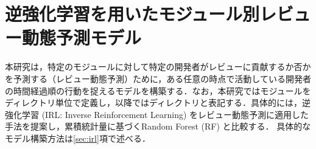\documentclass[submit,noauthor,ses,dvipdfmx]{ipsj}
\newcommand{\todo}[1]{\colorbox{yellow}{{\bf TODO}:}{\color{red} {\textbf{[#1]}}}}
\begin{document}



\vspace{-2mm}
\section{逆強化学習を用いたモジュール別レビュー動態予測モデル}\label{sec:model}

本研究は，特定のモジュールに対して特定の開発者がレビューに貢献するか否かを予測する（レビュー動態予測）ために，ある任意の時点で活動している開発者の時間経過順の行動を捉えるモデルを構築する．なお，本研究ではモジュールをディレクトリ単位で定義し，以降ではディレクトリと表記する．具体的には，逆強化学習 (IRL: Inverse Reinforcement Learning) をレビュー動態予測に適用した手法を提案し，累積統計量に基づくRandom Forest (RF) と比較する．
具体的なモデル構築方法は\ref{sec:irl}項で述べる．


\end{document}
